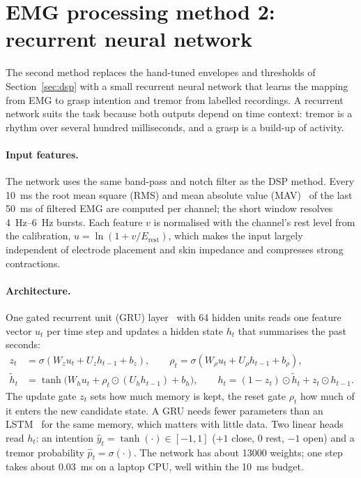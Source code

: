 \section{EMG processing method 2: recurrent neural network}
\label{sec:rnn}

The second method replaces the hand-tuned envelopes and thresholds of
Section~\ref{sec:dsp} with a small recurrent neural network that learns the mapping from
EMG to grasp intention and tremor from labelled recordings. A recurrent network suits the
task because both outputs depend on time context: tremor is a rhythm over several
hundred milliseconds, and a grasp is a build-up of activity.

\paragraph{Input features.}
The network uses the same band-pass and notch filter as the DSP method. Every \SI{10}{ms}
the root mean square (RMS) and mean absolute value (MAV)~\cite{hudgins1993new} of the
last \SI{50}{ms} of filtered EMG are computed per channel; the short window resolves
\SIrange{4}{6}{Hz} bursts. Each feature $v$ is normalised with the channel's rest level
from the calibration, $u = \ln(1 + v/E_\text{rest})$, which makes the input largely
independent of electrode placement and skin impedance and compresses strong contractions.

\paragraph{Architecture.}
One gated recurrent unit (GRU) layer~\cite{cho2014learning} with 64 hidden units reads
one feature vector $u_t$ per time step and updates a hidden state $h_t$ that summarises
the past seconds:
\begin{align}
  z_t &= \sigma(W_z u_t + U_z h_{t-1} + b_z), \qquad
  \rho_t = \sigma(W_\rho u_t + U_\rho h_{t-1} + b_\rho), \\
  \tilde h_t &= \tanh\!\big(W_h u_t + \rho_t \odot (U_h h_{t-1}) + b_h\big), \qquad
  h_t = (1 - z_t) \odot \tilde h_t + z_t \odot h_{t-1}.
\end{align}
The update gate $z_t$ sets how much memory is kept, the reset gate $\rho_t$ how much of
it enters the new candidate state. A GRU needs fewer parameters than an
LSTM~\cite{hochreiter1997long} for the same memory, which matters with little data. Two
linear heads read $h_t$: an intention $\hat y_t = \tanh(\cdot) \in [-1, 1]$ ($+1$ close,
$0$ rest, $-1$ open) and a tremor probability $\hat p_t = \sigma(\cdot)$. The network has
about \num{13000} weights; one step takes about \SI{0.03}{ms} on a laptop CPU, well within
the \SI{10}{ms} budget.

